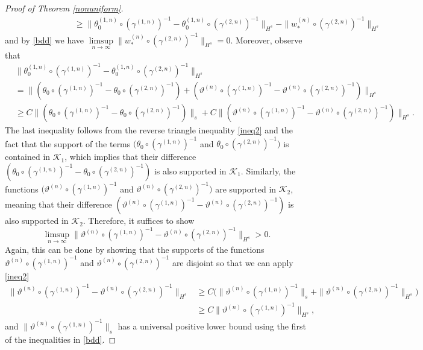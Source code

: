 \documentclass[11pt]{amsart}
\numberwithin{equation}{section}
\begin{document}
\begin{proof}[Proof of Theorem \ref{nonuniform}]
\begin{align*}
		 &  \quad\quad \qquad\qquad\quad\geq
       \|\theta_0^{(1,n)} \circ (\gamma^{(1,n)})^{-1}-\theta_0^{(1,n)} \circ ( \gamma^{(2,n)})^{-1} \|_{H^s} - \|w_*^{(n)} \circ (\gamma^{(2,n)})^{-1}\|_{H^s}
	\end{align*}
	and by \eqref{bdd} we have $\limsup\limits_{n \to \infty} \|w_*^{(n)} \circ ( \gamma^{(2,n)})^{-1}\|_{H^s}=0$. Moreover, observe that
	\begin{align*}
		&\|\theta_0^{(1,n)} \circ (\gamma^{(1,n)})^{-1}-\theta_0^{(1,n)} \circ (\gamma^{(2,n)})^{-1} \|_{H^s}\\
        &= \|(\theta_0 \circ (\gamma^{(1,n)})^{-1}- \theta_0 \circ (\gamma^{(2,n)})^{-1})+(\vartheta^{(n)} \circ (\gamma^{(1,n)})^{-1}-\vartheta^{(n)} \circ (\gamma^{(2,n)})^{-1})\|_{H^s}\\
        &\ge C \|(\theta_0 \circ (\gamma^{(1,n)})^{-1}- \theta_0 \circ (\gamma^{(2,n)})^{-1})\|_{s}+ C\|(\vartheta^{(n)} \circ (\gamma^{(1,n)})^{-1}-\vartheta^{(n)} \circ (\gamma^{(2,n)})^{-1})\|_{H^s}.
	\end{align*}
    The last inequality follows from the reverse triangle inequality \eqref{ineq2} and the fact that the support of the terms $(\theta_0 \circ (\gamma^{(1,n)})^{-1}$ and $ \theta_0 \circ (\gamma^{(2,n)})^{-1})$ is contained in $\mathcal{K}_1$, which implies that their difference $(\theta_0 \circ (\gamma^{(1,n)})^{-1}- \theta_0 \circ (\gamma^{(2,n)})^{-1})$ is also supported in $\mathcal{K}_1$. Similarly, the functions  $(\vartheta^{(n)} \circ (\gamma^{(1,n)})^{-1}$ and $\vartheta^{(n)} \circ (\gamma^{(2,n)})^{-1})$ are supported in $\mathcal{K}_2$, meaning that their difference $(\vartheta^{(n)} \circ (\gamma^{(1,n)})^{-1}-\vartheta^{(n)} \circ (\gamma^{(2,n)})^{-1})$ is also supported in $\mathcal{K}_2$. Therefore, it suffices to show	\[
	\limsup_{n \to \infty} \|\vartheta^{(n)} \circ (\gamma^{(1,n)})^{-1} - \vartheta^{(n)} \circ (\gamma^{(2,n)})^{-1}\|_{H^s} > 0.
	\]
Again, this can be done by showing that the supports of the functions $\vartheta^{(n)} \circ (\gamma^{(1,n)})^{-1}$ and $\vartheta^{(n)} \circ ( \gamma^{(2,n)})^{-1}$ are disjoint so that we can apply \eqref{ineq2}
\begin{align}
    \|\vartheta^{(n)} \circ (\gamma^{(1,n)})^{-1} - \vartheta^{(n)} \circ ( \gamma^{(2,n)})^{-1}\|_{H^s}&\ge C\Big(\|\vartheta^{(n)} \circ (\gamma^{(1,n)})^{-1}\|_{s} +\| \vartheta^{(n)} \circ (\gamma^{(2,n)})^{-1}\|_{H^s}\Big)\\
    &\ge C\|\vartheta^{(n)} \circ (\gamma^{(1,n)})^{-1}\|_{H^s},
\end{align}
and $\|\vartheta^{(n)} \circ (\gamma^{(1,n)})^{-1}\|_{s}$ has a universal positive lower bound using the first of the inequalities in \eqref{bdd}. 


\end{proof}
\end{document}
